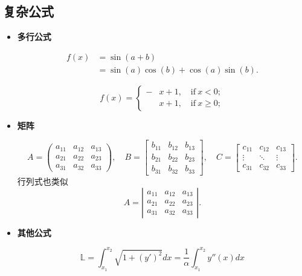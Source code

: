 \subsection{复杂公式}
\begin{itemize}
\item \textbf{多行公式}

\begin{equation}\label{Eq:eq2}
\begin{aligned}
f(x) &= \sin(a+b)\\
&= \sin(a)\cos(b)+\cos(a)\sin(b).
\end{aligned}
\end{equation}

\begin{equation}\label{Eq:eq3}
f(x) = \left\{
\begin{aligned}
 -&x+1,\quad \text{if}~x<0;\\
 &x+1,\quad \text{if}~x \geq 0;
 \end{aligned}
 \right.
\end{equation}

\item \textbf{矩阵}

\[
  A = \left(\begin{array}{ccc}
        a_{11} & a_{12} & a_{13} \\
        a_{21} & a_{22} & a_{23} \\
        a_{31} & a_{32} & a_{33}
      \end{array}\right),\quad
  B = \left[\begin{array}{ccc}
        b_{11} & b_{12} & b_{13} \\
        b_{21} & b_{22} & b_{23} \\
        b_{31} & b_{32} & b_{33}
      \end{array}\right],\quad
   C = \left[\begin{array}{ccc}
     c_{11} & c_{12} & c_{13} \\
     \vdots & \ddots & \vdots \\
     c_{31} & c_{32} & c_{33}
   \end{array}\right].
\]
行列式也类似
\[
A = \left|\begin{array}{ccc}
    a_{11} & a_{12} & a_{13} \\
    a_{21} & a_{22} & a_{23} \\
    a_{31} & a_{32} & a_{33}
  \end{array}\right|.
\]

\item \textbf{其他公式}

\[
\mathbb{L} = \int_{x_1}^{x_2}\sqrt{1+(y')^2}dx 
= \frac{1}{\alpha}\int_{x_1}^{x_2}y''(x)dx
\]

\end{itemize}

